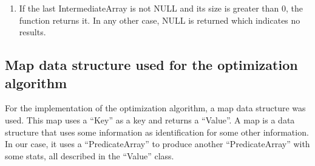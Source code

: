 \documentclass{ws-ijprai}
\begin{document}
\begin{enumerate}
\begin{enumerate}
\begin{enumerate}
            \item For each array id and field id, if the combination of them participated in the last join, the above corresponding extracted relation does \textbf{not} get reordered, because it already is. In the opposite case, the relation gets reordered with \textbf{radix-sort}.
            \item The 2 above ordered relations are joined in a list which is then converted to a 2-column array with each column containing the row ids of either the original input array or the current IntermediateArray as mentioned in step (i).
            \item If the result contains 0 entries, then the function does the necessary memory deallocation and returns NULL which indicates no results.
            \item If the result contains more than 0 entries: 
                \begin{itemize}
                    \item If this is the first join, the first IntermediateArray is created which consists of only the above 2-column result \textbf{or}
                    \item If this is a consecutive join, a new IntermediateArray is created which consists of the contents of the previous IntermediateArray \textbf{plus} the column with the row ids of the first-time-joined InputArray. This new IntermediateArray has as row count this join result\textquotesingle s row count and it takes the place of the old IntermediateArray.
                \end{itemize}
        \end{enumerate}
        \item If the last IntermediateArray is not NULL and its size is greater than 0, the function returns it. In any other case, NULL is returned which indicates no results.
    \end{enumerate}
\end{enumerate}

\subsection{Map data structure used for the optimization algorithm}
\tab For the implementation of the optimization algorithm, a map data structure was used. This map uses a “Key” as a key and returns a “Value”. A map is a data structure that uses some information as identification for some other information. In our case, it uses a “PredicateArray” to produce another “PredicateArray” with some stats, all described in the “Value” class.
\end{document}
